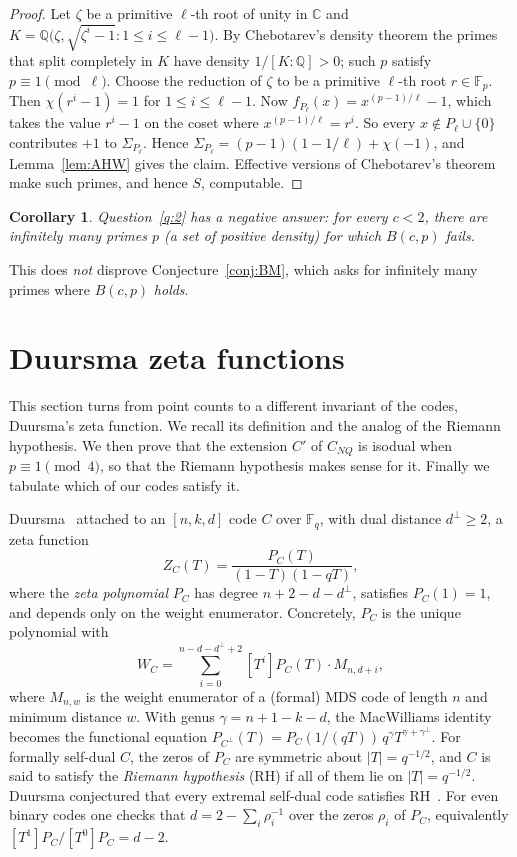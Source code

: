 \documentclass[12pt,letterpaper]{article}
\newtheorem{corollary}[theorem]{Corollary}
\theoremstyle{definition}
\theoremstyle{remark}
\numberwithin{equation}{section}
\newcommand{\F}{\mathbb{F}}
\newcommand{\Fp}{\mathbb{F}_p}
\newcommand{\Q}{\mathbb{Q}}
\newcommand{\C}{\mathbb{C}}
\newcommand{\CNQ}{C_{NQ}}
\begin{document}
\begin{proof}
Let $\zeta$ be a primitive $\ell$-th root of unity in $\C$ and
$K=\Q\big(\zeta,\sqrt{\zeta^i-1}:1\le i\le\ell-1\big)$. By Chebotarev's density
theorem the primes that split completely in $K$ have density $1/[K:\Q]>0$; such
$p$ satisfy $p\equiv1\pmod\ell$. Choose the reduction of $\zeta$ to be a primitive
$\ell$-th root $r\in\Fp$. Then $\chi(r^i-1)=1$ for $1\le i\le\ell-1$. Now
$f_{P_\ell}(x)=x^{(p-1)/\ell}-1$, which takes the value $r^i-1$ on the coset
where $x^{(p-1)/\ell}=r^i$. So every $x\notin P_\ell\cup\{0\}$ contributes $+1$ to
$\Sigma_{P_\ell}$. Hence $\Sigma_{P_\ell}=(p-1)(1-1/\ell)+\chi(-1)$, and
Lemma~\ref{lem:AHW} gives the claim. Effective versions of Chebotarev's
theorem~\cite{LO77,Se81} make such primes, and hence $S$, computable.
\end{proof}

\begin{corollary}
Question~\ref{q:2} has a negative answer: for every $c<2$, there are infinitely many
primes $p$ (a set of positive density) for which $B(c,p)$ fails.
\end{corollary}

This does \emph{not} disprove Conjecture~\ref{conj:BM}, which asks for infinitely
many primes where $B(c,p)$ \emph{holds}.

\section{Duursma zeta functions}
\label{sec:zeta}

This section turns from point counts to a different invariant of the codes,
Duursma's zeta function. We recall its definition and the analog of the Riemann
hypothesis. We then prove that the extension $C'$ of $\CNQ$ is isodual when
$p\equiv1\pmod 4$, so that the Riemann hypothesis makes sense for it. Finally we
tabulate which of our codes satisfy it.

Duursma~\cite{Du99,Du01} attached to an $[n,k,d]$ code $C$ over $\F_q$, with dual
distance $d^\perp\ge2$, a zeta function
\[
Z_C(T)=\frac{P_C(T)}{(1-T)(1-qT)},
\]
where the \emph{zeta polynomial} $P_C$ has degree $n+2-d-d^\perp$, satisfies
$P_C(1)=1$, and depends only on the weight enumerator. Concretely, $P_C$ is the
unique polynomial with
\[
W_C=\sum_{i=0}^{n-d-d^\perp+2} [T^i]P_C(T)\cdot M_{n,d+i},
\]
where $M_{n,w}$ is the weight enumerator of a (formal) MDS code of length $n$ and
minimum distance $w$. With genus $\gamma=n+1-k-d$, the MacWilliams identity becomes
the functional equation
$P_{C^\perp}(T)=P_C(1/(qT))\,q^{\gamma}T^{\gamma+\gamma^\perp}$.
For formally self-dual $C$, the zeros of $P_C$ are symmetric about $|T|=q^{-1/2}$,
and $C$ is said to satisfy the \emph{Riemann hypothesis} (RH) if all of them lie on
$|T|=q^{-1/2}$. Duursma conjectured that every extremal self-dual code satisfies
RH~\cite{Du03}. For even binary codes one checks that
$d=2-\sum_i\rho_i^{-1}$ over the zeros $\rho_i$ of $P_C$, equivalently
$[T^1]P_C/[T^0]P_C=d-2$.
\end{document}
